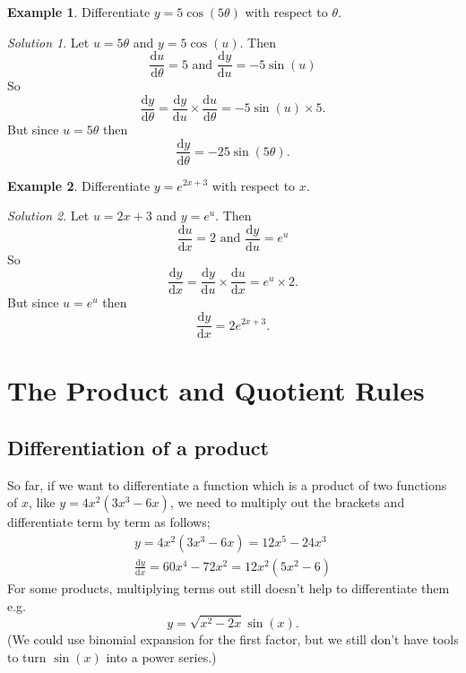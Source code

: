 \documentclass[
  11pt,
  oneside]{book}
\newcommand{\slide}{}
\theoremstyle{definition}
\theoremstyle{definition}
\newtheorem{example}{Example}[chapter]
\theoremstyle{definition}
\theoremstyle{definition}
\theoremstyle{remark}
\newtheorem*{solution}{Solution}
\begin{document}
\slide

\begin{example}
Differentiate \(y=5\cos(5\theta)\) with respect to \(\theta\).
\end{example}

\begin{solution}
Let \(u = 5\theta\) and \(y = 5\cos(u)\). Then
\[
\frac{\mathrm{d} u}{{\mathrm{d} \theta}} = 5\text{ and }\frac{\mathrm{d} y}{\mathrm{d} u} = -5\sin(u)
\]
So
\[
\frac{\mathrm{d} y}{{\mathrm{d} \theta}} = \frac{\mathrm{d} y}{\mathrm{d} u}\times\frac{\mathrm{d} u}{{\mathrm{d} \theta}} = -5\sin(u)\times5.
\]
But since \(u = 5\theta\) then
\[
\frac{\mathrm{d} y}{{\mathrm{d} \theta}} = -25\sin(5\theta).
\]
\end{solution}

\slide

\begin{example}
Differentiate \(y=e^{2x+3}\) with respect to \(x\).
\end{example}

\begin{solution}
Let \(u = 2x+3\) and \(y = e^u\). Then
\[
\frac{\mathrm{d} u}{\mathrm{d} x} = 2\text{ and }\frac{\mathrm{d} y}{\mathrm{d} u} = e^u
\]
So
\[
\frac{\mathrm{d} y}{\mathrm{d} x} = \frac{\mathrm{d} y}{\mathrm{d} u}\times\frac{\mathrm{d} u}{\mathrm{d} x} = e^u\times2.
\]
But since \(u = e^u\) then
\[
\frac{\mathrm{d} y}{\mathrm{d} x} = 2e^{2x+3}.
\]
\end{solution}

\slide

\section{The Product and Quotient Rules}\label{lecture-six}

\subsection{Differentiation of a product}\label{differentiation-of-a-product}

So far, if we want to differentiate a function which is a product of two functions of \(x\), like \(y = 4x^2(3x^3 - 6x)\), we need to multiply out the brackets and differentiate term by term as follows;
\begin{gather*}
y = 4x^2(3x^3 - 6x) = 12x^5 - 24x^3\\
\frac{\mathrm{d} y}{\mathrm{d} x} = 60x^4 - 72x^2 = 12x^2(5x^2 - 6)
\end{gather*}
For some products, multiplying terms out still doesn't help to differentiate them e.g.
\[
y = \sqrt{x^2 - 2x} \sin(x).
\]
(We could use binomial expansion for the first factor, but we still don't have tools to turn \(\sin(x)\) into a power series.)
\slide
\end{document}
